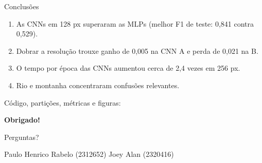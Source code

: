 \documentclass[aspectratio=169,10pt,t]{beamer}
\begin{document}
\begin{frame}{Conclusões}
\begin{enumerate}
\item As CNNs em 128 px superaram as MLPs (melhor F1 de teste: 0,841 contra 0,529).
\item Dobrar a resolução trouxe ganho de 0,005 na CNN A e perda de 0,021 na B.
\item O tempo por época das CNNs aumentou cerca de 2,4 vezes em 256 px.
\item Rio e montanha concentraram confusões relevantes.
\end{enumerate}
\vskip4mm
\vfill
\centering\small Código, partições, métricas e figuras: \repo
\end{frame}

\begin{frame}[plain]
\vfill
\centering
{\color{azul}\fontsize{30}{34}\selectfont\bfseries Obrigado!\par}
\vskip4mm
{\large\color{azulclaro}Perguntas?\par}
\vskip6mm
\small Paulo Henrico Rabelo (2312652) \quad Joey Alan (2320416)\\[2pt]
\repo
\vfill
\end{frame}
\end{document}
